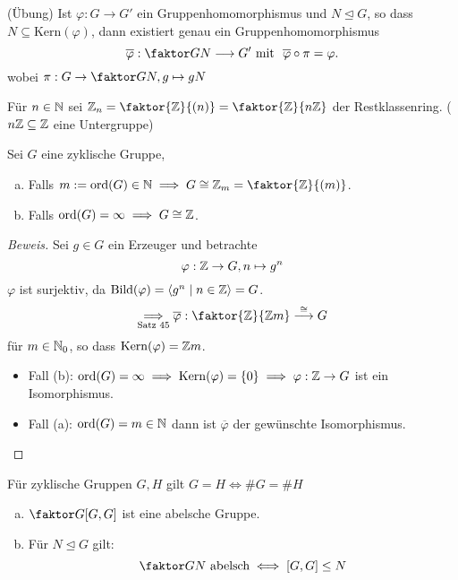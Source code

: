 \documentclass[a4paper]{report}
\begin{document}
\begin{satz45'}[Homomorphiesatz'](Übung)
  Ist $\varphi : G \to G'$ ein Gruppenhomomorphismus und $N \trianglelefteq G$, so dass $N \subseteq \mathrm{Kern}(\varphi)$, dann existiert genau ein Gruppenhomomorphismus $$\overline\varphi : \faktor GN \longrightarrow G'\text{ mit }\ \overline\varphi \circ \pi = \varphi.$$
  wobei $\pi : G \to \faktor GN, g \mapsto gN$
\end{satz45'}
\begin{nota*}
Für $n \in \Bbb N$ sei $\Bbb Z_{n} = \faktor {\Bbb Z}{(n)} = \faktor{\Bbb Z}{n\Bbb Z}$ der Restklassenring. ($n\Bbb Z \subseteq \Bbb Z $ eine Untergruppe)
\end{nota*}

\begin{kor}
  Sei $G$ eine zyklische Gruppe,
  \begin{enumerate}[(a)]
    \item Falls $m:= \mathrm{ord}(G) \in \Bbb N \implies G \cong \Bbb Z_{m} = \faktor{\Bbb Z}{(m)}$.
          \item Falls $\mathrm{ord}(G) = \infty \implies G \cong \Bbb Z$.
  \end{enumerate}
\begin{proof}[Beweis]
  Sei $g \in G$ ein Erzeuger und betrachte $$\varphi : \Bbb Z \to G, n \mapsto g^{n}$$
  $\varphi$ ist surjektiv, da $\mathrm{Bild}(\varphi) = \langle g^{n} \mid n \in \Bbb Z \rangle = G$.
  $$\underset{\text{Satz 45}}\implies \overline\varphi : \faktor{\Bbb Z}{\Bbb Zm} \overset \cong \longrightarrow{} G$$
  für $m \in \Bbb N_{0}$, so dass $\mathrm{Kern}(\varphi) = \Bbb Zm$.
  \begin{itemize}
\item Fall (b): $\mathrm{ord}(G) = \infty \implies \mathrm{Kern}(\varphi) = \{0\} \implies \varphi : \Bbb Z \to G$ ist ein Isomorphismus.
\item Fall (a): $\mathrm{ord}(G) = m \in \Bbb N$ dann ist $\overline\varphi$ der gewünschte Isomorphismus.\qedhere
 \end{itemize}
\end{proof}
\end{kor}
\begin{kor}Für zyklische Gruppen $G, H$ gilt $G = H \iff \#G = \#H$
\end{kor}
\begin{ubng*}
\begin{enumerate}[(a)]
  \item $\faktor G{[G, G]}$ ist eine abelsche Gruppe.
  \item Für $N \trianglelefteq G$ gilt:
        $$\faktor GN \text{ abelsch} \iff [G, G] \le N$$
\end{enumerate}
\end{ubng*}
\end{document}
